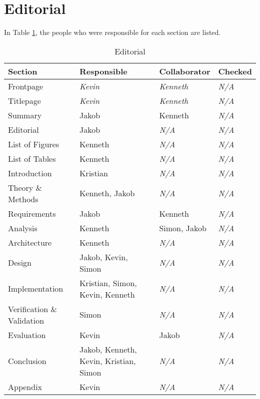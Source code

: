 \section{Editorial}
In Table \ref{table:editorial}, the people who were responsible for each section
are listed.
\begin{table}[ht]
    \begin{tabularx}{\textwidth}{|>{\RaggedRight}X|>{\RaggedRight}X|>{\RaggedRight}X|>{\RaggedRight}X|}
        \hline
        \textbf{Section} & \textbf{Responsible} & \textbf{Collaborator} & \textbf{Checked}\\
        \hline
        Frontpage & \textit{Kevin} & \textit{Kenneth} & \textit{N/A}\\
        \hline
        Titlepage & \textit{Kevin} & \textit{Kenneth} & \textit{N/A}\\
        \hline
        Summary & Jakob & Kenneth & \textit{N/A}\\
        \hline
        Editorial & Jakob & \textit{N/A} & \textit{N/A}\\
        \hline
        List of Figures & Kenneth & \textit{N/A} & \textit{N/A}\\
        \hline
        List of Tables & Kenneth & \textit{N/A} & \textit{N/A}\\
        \hline
        Introduction & Kristian & \textit{N/A} & \textit{N/A}\\
        \hline
        Theory \& Methods & Kenneth, Jakob & \textit{N/A} & \textit{N/A}\\
        \hline
        Requirements & Jakob & Kenneth & \textit{N/A}\\
        \hline
        Analysis & Kenneth & Simon, Jakob & \textit{N/A}\\
        \hline
        Architecture & Kenneth & \textit{N/A} & \textit{N/A}\\
        \hline
        Design & Jakob, Kevin, Simon & \textit{N/A} & \textit{N/A}\\
        \hline
        Implementation & Kristian, Simon, Kevin, Kenneth & \textit{N/A} & \textit{N/A}\\
        \hline
        Verification \& Validation & Simon & \textit{N/A} & \textit{N/A}\\
        \hline
        Evaluation & Kevin & Jakob & \textit{N/A}\\
        \hline
        Conclusion & Jakob, Kenneth, Kevin, Kristian, Simon & \textit{N/A} & \textit{N/A}\\
        \hline
        Appendix & Kevin & \textit{N/A} & \textit{N/A}\\
        \hline
    \end{tabularx}
    \caption{Editorial} 
    \label{table:editorial}
\end{table} 

